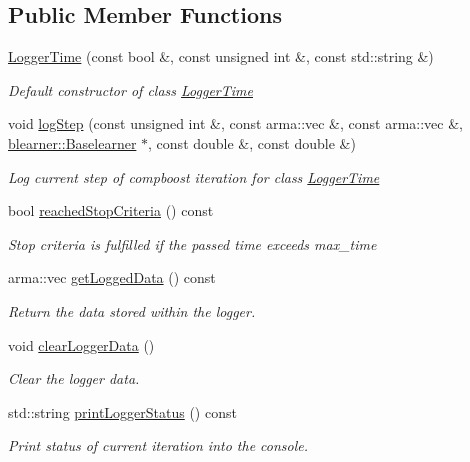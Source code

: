 \subsection*{Public Member Functions}
\begin{DoxyCompactItemize}
\item 
\hyperlink{classlogger_1_1_logger_time_a9dd340473ea5d705bc1a5bcdc948c0b3}{Logger\+Time} (const bool \&, const unsigned int \&, const std\+::string \&)
\begin{DoxyCompactList}\small\item\em Default constructor of class {\ttfamily \hyperlink{classlogger_1_1_logger_time}{Logger\+Time}} \end{DoxyCompactList}\item 
void \hyperlink{classlogger_1_1_logger_time_aec35d7d3c780043ff2b7c9f71712abbc}{log\+Step} (const unsigned int \&, const arma\+::vec \&, const arma\+::vec \&, \hyperlink{classblearner_1_1_baselearner}{blearner\+::\+Baselearner} $\ast$, const double \&, const double \&)
\begin{DoxyCompactList}\small\item\em Log current step of compboost iteration for class {\ttfamily \hyperlink{classlogger_1_1_logger_time}{Logger\+Time}} \end{DoxyCompactList}\item 
bool \hyperlink{classlogger_1_1_logger_time_a727f16a2deed4d64293844615f18df08}{reached\+Stop\+Criteria} () const
\begin{DoxyCompactList}\small\item\em Stop criteria is fulfilled if the passed time exceeds {\ttfamily max\+\_\+time} \end{DoxyCompactList}\item 
arma\+::vec \hyperlink{classlogger_1_1_logger_time_a8723a078c86c1470208dccadffed5c1b}{get\+Logged\+Data} () const
\begin{DoxyCompactList}\small\item\em Return the data stored within the logger. \end{DoxyCompactList}\item 
void \hyperlink{classlogger_1_1_logger_time_a0bcce74556cf50de86b8d7333d82e919}{clear\+Logger\+Data} ()
\begin{DoxyCompactList}\small\item\em Clear the logger data. \end{DoxyCompactList}\item 
std\+::string \hyperlink{classlogger_1_1_logger_time_a22bef2a992b88689d7748c4017e17d19}{print\+Logger\+Status} () const
\begin{DoxyCompactList}\small\item\em Print status of current iteration into the console. \end{DoxyCompactList}\end{DoxyCompactItemize}
